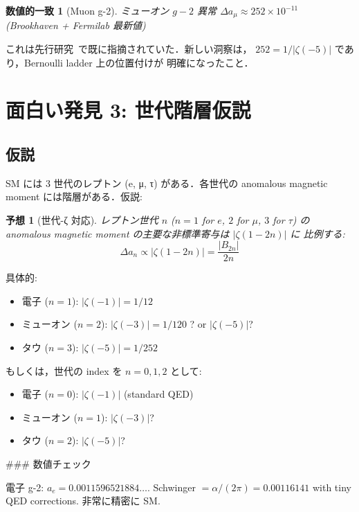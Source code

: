 \documentclass[11pt,a4paper]{article}
\newtheorem{coincidence}{数値的一致}
\newtheorem{conjecture}{予想}
\begin{document}
\begin{coincidence}[Muon g-2]
ミューオン $g-2$ 異常 $\Delta a_\mu \approx 252 \times 10^{-11}$
(Brookhaven + Fermilab 最新値)
\end{coincidence}

これは先行研究~\cite{muonNote}で既に指摘されていた．新しい洞察は，
$252 = 1/|\zeta(-5)|$ であり，Bernoulli ladder 上の位置付けが
明確になったこと．

\section{面白い発見 3: 世代階層仮説}

\subsection{仮説}

SM には 3 世代のレプトン (e, μ, τ) がある．各世代の anomalous
magnetic moment には階層がある．仮説:

\begin{conjecture}[世代-ζ 対応]
レプトン世代 $n$ ($n = 1$ for $e$, $2$ for $\mu$, $3$ for $\tau$) の
anomalous magnetic moment の主要な非標準寄与は $|\zeta(1-2n)|$ に
比例する:
\begin{equation}
\Delta a_n \propto |\zeta(1-2n)| = \frac{|B_{2n}|}{2n}
\end{equation}
\end{conjecture}

具体的:
\begin{itemize}
\item 電子 ($n=1$): $|\zeta(-1)| = 1/12$
\item ミューオン ($n=2$): $|\zeta(-3)| = 1/120$ ? or $|\zeta(-5)|$?
\item タウ ($n=3$): $|\zeta(-5)| = 1/252$
\end{itemize}

もしくは，世代の index を $n = 0, 1, 2$ として:
\begin{itemize}
\item 電子 ($n=0$): $|\zeta(-1)|$ (standard QED)
\item ミューオン ($n=1$): $|\zeta(-3)|$?
\item タウ ($n=2$): $|\zeta(-5)|$?
\end{itemize}

### 数値チェック

電子 g-2: $a_e = 0.0011596521884 \ldots$. Schwinger $= \alpha/(2\pi) = 0.00116141$ with tiny QED corrections. 非常に精密に SM.
\end{document}
